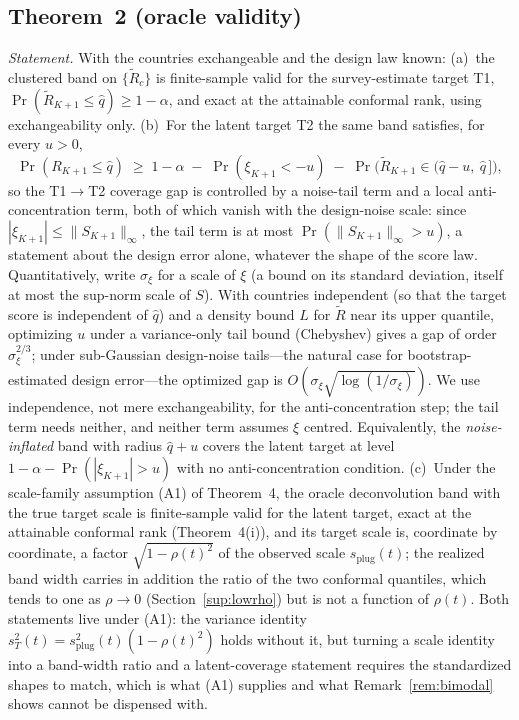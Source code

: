 \documentclass[12pt]{article}
\theoremstyle{definition}
\theoremstyle{remark}
\begin{document}
\subsection{Theorem~2 (oracle validity)}

\emph{Statement.} With the countries exchangeable and the design law known: (a)~the
clustered band on $\{\widetilde R_c\}$ is finite-sample valid for the
survey-estimate target T1, $\Pr(\widetilde R_{K+1}\le\widehat q)\ge1-\alpha$,
and exact at the attainable conformal rank, using exchangeability only.
(b)~For the latent target T2 the same band satisfies, for every $u>0$,
\[
\Pr(R_{K+1}\le\widehat q)\;\ge\;1-\alpha\;-\;\Pr(\xi_{K+1}<-u)\;-\;
\Pr\big(\widetilde R_{K+1}\in(\widehat q-u,\ \widehat q\,]\big),
\]
so the T1$\to$T2 coverage gap is controlled by a noise-tail term and a local
anti-concentration term, both of which vanish with the design-noise scale:
since $|\xi_{K+1}|\le\lVert S_{K+1}\rVert_\infty$, the tail term is at most
$\Pr(\lVert S_{K+1}\rVert_\infty>u)$, a statement about the design error
alone, whatever the shape of the score law. Quantitatively, write
$\sigma_\xi$ for a scale of $\xi$ (a bound on its standard deviation, itself
at most the sup-norm scale of $S$). With countries independent (so that the
target score is independent of $\widehat q$) and a density bound $L$ for
$\widetilde R$ near its upper quantile, optimizing $u$ under a variance-only
tail bound (Chebyshev) gives a gap of order $\sigma_\xi^{2/3}$; under
sub-Gaussian design-noise tails---the natural case for bootstrap-estimated
design error---the optimized gap is $O(\sigma_\xi\sqrt{\log(1/\sigma_\xi)})$.
We use independence, not mere exchangeability, for the anti-concentration
step; the tail term needs neither, and neither term assumes $\xi$ centred.
Equivalently, the \emph{noise-inflated} band with radius $\widehat q+u$ covers the
latent target at level $1-\alpha-\Pr(|\xi_{K+1}|>u)$ with no anti-concentration
condition. (c)~Under the scale-family assumption (A1) of Theorem~4, the
oracle deconvolution band with the true target scale is finite-sample
valid for the latent target, exact at the attainable conformal rank
(Theorem~4(i)), and its target scale is, coordinate by coordinate, a factor
$\sqrt{1-\rho(t)^2}$ of the observed scale $s_{\text{plug}}(t)$; the realized
band width carries in addition the ratio of the two conformal quantiles, which
tends to one as $\rho\to0$ (Section~\ref{sup:lowrho}) but is not a function of $\rho(t)$. Both
statements live under (A1): the variance identity
$s_T^2(t)=s_{\text{plug}}^2(t)(1-\rho(t)^2)$ holds without it, but turning
a scale identity into a band-width ratio and a latent-coverage statement
requires the standardized shapes to match, which is what (A1) supplies and
what Remark~\ref{rem:bimodal} shows cannot be dispensed with.
\end{document}
